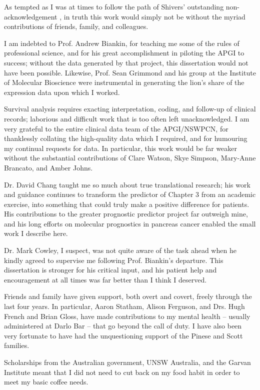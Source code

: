As tempted as I was at times to follow the path of Shivers' outstanding non-acknowledgement \cite{Shivers1994}, in truth this work would simply not be without the myriad contributions of friends, family, and colleagues.

I am indebted to Prof. Andrew Biankin, for teaching me some of the rules of professional science, and for his great accomplishment in piloting the \acrshort{APGI} to success; without the data generated by that project, this dissertation would not have been possible.  Likewise, Prof. Sean Grimmond and his group at the Institute of Molecular Bioscience were instrumental in generating the lion's share of the expression data upon which I worked.

Survival analysis requires exacting interpretation, coding, and follow-up of clinical records; laborious and difficult work that is too often left unacknowledged.  I am very grateful to the entire clinical data team of the \acrshort{APGI}/\acrshort{NSWPCN}, for thanklessly collating the high-quality data which I required, and for humouring my continual requests for data.  In particular, this work would be far weaker without the substantial contributions of Clare Watson, Skye Simpson, Mary-Anne Brancato, and Amber Johns.

Dr. David Chang taught me so much about true translational research; his work and guidance continues to transform the predictor of Chapter 3 from an academic exercise, into something that could truly make a positive difference for patients.  His contributions to the greater prognostic predictor project far outweigh mine, and his long efforts on molecular prognostics in pancreas cancer enabled the small work I describe here.

Dr. Mark Cowley, I suspect, was not quite aware of the task ahead when he kindly agreed to supervise me following Prof. Biankin's departure.  This dissertation is stronger for his critical input, and his patient help and encouragement at all times was far better than I think I deserved.

Friends and family have given support, both overt and covert, freely through the last four years.  In particular, Aaron Statham, Alison Ferguson, and Drs. Hugh French and Brian Gloss, have made contributions to my mental health -- usually administered at Darlo Bar -- that go beyond the call of duty.  I have also been very fortunate to have had the unquestioning support of the Pinese and Scott families.

Scholarships from the Australian government, UNSW Australia, and the Garvan Institute meant that I did not need to cut back on my food habit in order to meet my basic coffee needs.

